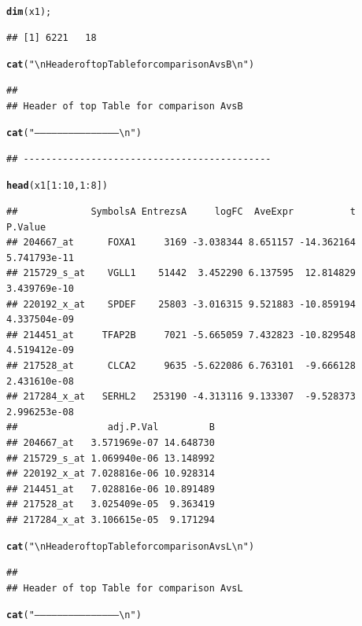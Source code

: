 \documentclass{article}\usepackage[]{graphicx}\usepackage[]{color}
\makeatletter
\newcommand{\hlnum}[1]{\textcolor[rgb]{0.686,0.059,0.569}{#1}}%
\newcommand{\hlstr}[1]{\textcolor[rgb]{0.192,0.494,0.8}{#1}}%
\newcommand{\hlopt}[1]{\textcolor[rgb]{0,0,0}{#1}}%
\newcommand{\hlstd}[1]{\textcolor[rgb]{0.345,0.345,0.345}{#1}}%
\newcommand{\hlkwd}[1]{\textcolor[rgb]{0.737,0.353,0.396}{\textbf{#1}}}%
\newenvironment{kframe}{%
 \def\at@end@of@kframe{}%
 \ifinner\ifhmode%
  \def\at@end@of@kframe{\end{minipage}}%
  \begin{minipage}{\columnwidth}%
 \fi\fi%
 \def\FrameCommand##1{\hskip\@totalleftmargin \hskip-\fboxsep
 \colorbox{shadecolor}{##1}\hskip-\fboxsep
     \hskip-\linewidth \hskip-\@totalleftmargin \hskip\columnwidth}%
 \MakeFramed {\advance\hsize-\width
   \@totalleftmargin\z@ \linewidth\hsize
   \@setminipage}}%
 {\par\unskip\endMakeFramed%
 \at@end@of@kframe}
\newenvironment{knitrout}{}{} %
\makeatother
\begin{document}
\begin{knitrout}
\begin{kframe}
\begin{alltt}
\hlkwd{dim}\hlstd{(x1);}
\end{alltt}
\begin{verbatim}
## [1] 6221   18
\end{verbatim}
\begin{alltt}
\hlkwd{cat}\hlstd{(}\hlstr{"\textbackslash{}nHeader of top Table for comparison AvsB\textbackslash{}n"}\hlstd{)}
\end{alltt}
\begin{verbatim}
## 
## Header of top Table for comparison AvsB
\end{verbatim}
\begin{alltt}
\hlkwd{cat}\hlstd{(}\hlstr{"--------------------------------------------\textbackslash{}n"}\hlstd{)}
\end{alltt}
\begin{verbatim}
## --------------------------------------------
\end{verbatim}
\begin{alltt}
\hlkwd{head}\hlstd{(x1[}\hlnum{1}\hlopt{:}\hlnum{10}\hlstd{,} \hlnum{1}\hlopt{:}\hlnum{8}\hlstd{])}
\end{alltt}
\begin{verbatim}
##             SymbolsA EntrezsA     logFC  AveExpr          t      P.Value
## 204667_at      FOXA1     3169 -3.038344 8.651157 -14.362164 5.741793e-11
## 215729_s_at    VGLL1    51442  3.452290 6.137595  12.814829 3.439769e-10
## 220192_x_at    SPDEF    25803 -3.016315 9.521883 -10.859194 4.337504e-09
## 214451_at     TFAP2B     7021 -5.665059 7.432823 -10.829548 4.519412e-09
## 217528_at      CLCA2     9635 -5.622086 6.763101  -9.666128 2.431610e-08
## 217284_x_at   SERHL2   253190 -4.313116 9.133307  -9.528373 2.996253e-08
##                adj.P.Val         B
## 204667_at   3.571969e-07 14.648730
## 215729_s_at 1.069940e-06 13.148992
## 220192_x_at 7.028816e-06 10.928314
## 214451_at   7.028816e-06 10.891489
## 217528_at   3.025409e-05  9.363419
## 217284_x_at 3.106615e-05  9.171294
\end{verbatim}
\begin{alltt}
\hlkwd{cat}\hlstd{(}\hlstr{"\textbackslash{}nHeader of top Table for comparison AvsL\textbackslash{}n"}\hlstd{)}
\end{alltt}
\begin{verbatim}
## 
## Header of top Table for comparison AvsL
\end{verbatim}
\begin{alltt}
\hlkwd{cat}\hlstd{(}\hlstr{"--------------------------------------------\textbackslash{}n"}\hlstd{)}

\end{alltt}
\end{kframe}
\end{knitrout}
\end{document}

